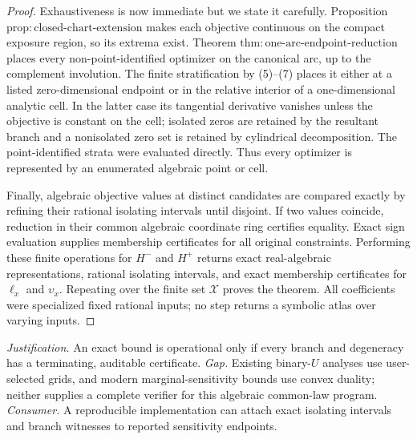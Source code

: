 \documentclass{article}
\begin{document}
\begin{proof}
Exhaustiveness is now immediate but we state it carefully.  Proposition \(\mathrm{prop{:}closed\text{-}chart\text{-}extension}\) makes each objective continuous on the compact exposure region, so its extrema exist.  Theorem \(\mathrm{thm{:}one\text{-}arc\text{-}endpoint\text{-}reduction}\) places every non-point-identified optimizer on the canonical arc, up to the complement involution.  The finite stratification by (5)--(7) places it either at a listed zero-dimensional endpoint or in the relative interior of a one-dimensional analytic cell.  In the latter case its tangential derivative vanishes unless the objective is constant on the cell; isolated zeros are retained by the resultant branch and a nonisolated zero set is retained by cylindrical decomposition.  The point-identified strata were evaluated directly.  Thus every optimizer is represented by an enumerated algebraic point or cell.

Finally, algebraic objective values at distinct candidates are compared exactly by refining their rational isolating intervals until disjoint.  If two values coincide, reduction in their common algebraic coordinate ring certifies equality.  Exact sign evaluation supplies membership certificates for all original constraints.  Performing these finite operations for \(H^-\) and \(H^+\) returns exact real-algebraic representations, rational isolating intervals, and exact membership certificates for \(\ell_x\) and \(\upsilon_x\).  Repeating over the finite set \(\mathcal X\) proves the theorem.  All coefficients were specialized fixed rational inputs; no step returns a symbolic atlas over varying inputs.
\end{proof}
\par\smallskip\noindent \textit{Justification.} An exact bound is operational only if every branch and degeneracy has a terminating, auditable certificate. \textit{Gap.} Existing binary-\(U\) analyses use user-selected grids, and modern marginal-sensitivity bounds use convex duality; neither supplies a complete verifier for this algebraic common-law program. \textit{Consumer.} A reproducible implementation can attach exact isolating intervals and branch witnesses to reported sensitivity endpoints.
\end{document}
